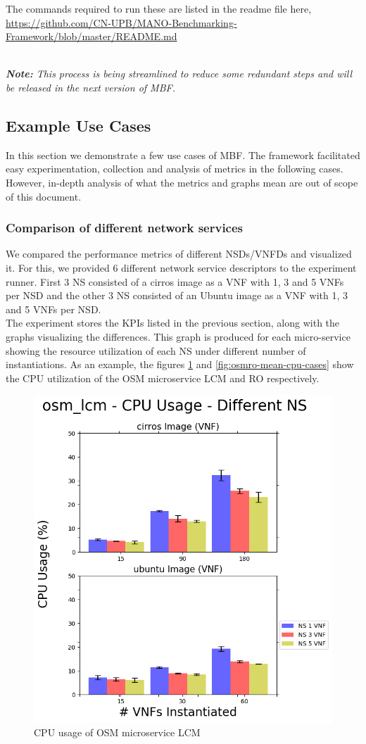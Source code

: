 The commands required to run these are listed in the readme file here, \\ \url{https://github.com/CN-UPB/MANO-Benchmarking-Framework/blob/master/README.md}

\textit{\\\textbf{Note:} This process is being streamlined to reduce some redundant steps and will be released in the next version of MBF.} 

\subsection{Example Use Cases}

In this section we demonstrate a few use cases of MBF. 
The framework facilitated easy experimentation, collection and analysis of metrics in the following cases. 
However, in-depth analysis of what the metrics and graphs mean are out of scope of this document. 



\subsubsection{Comparison of different network services} 

We compared the performance metrics of different NSDs/VNFDs and visualized it. 
For this, we provided 6 different network service descriptors to the experiment runner. 
First 3 NS consisted of a cirros image as a VNF with 1, 3 and 5 VNFs per NSD and the other 3 NS consisted of an Ubuntu image as a VNF with 1, 3 and 5 VNFs per NSD.\\

The experiment stores the KPIs listed in the previous section, along with the graphs visualizing the differences. 
This graph is produced for each micro-service showing the resource utilization of each NS under different number of instantiations. 
As an example, the figures \ref{fig:osmlcm-mean-cpu-cases} and \ref{fig:osmro-mean-cpu-cases} show the CPU utilization of the OSM microservice LCM and RO respectively.

\begin{figure}[h]
	\centering
	\includegraphics[width=0.6\linewidth]{figures/scalability_graphs/Docker-Grouped-Cases/osm/osm_lcm-Mean-CPU-Cases}
	\caption{CPU usage of OSM microservice LCM}
	\label{fig:osmlcm-mean-cpu-cases}
\end{figure}


